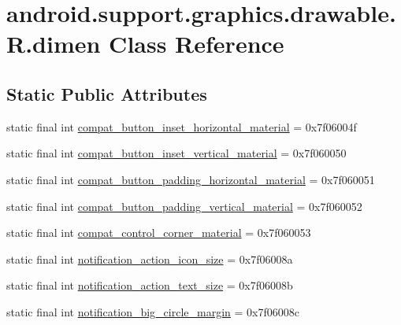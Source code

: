\hypertarget{classandroid_1_1support_1_1graphics_1_1drawable_1_1R_1_1dimen}{}\section{android.\+support.\+graphics.\+drawable.\+R.\+dimen Class Reference}
\label{classandroid_1_1support_1_1graphics_1_1drawable_1_1R_1_1dimen}
\subsection*{Static Public Attributes}
\begin{DoxyCompactItemize}
\item 
static final int \mbox{\hyperlink{classandroid_1_1support_1_1graphics_1_1drawable_1_1R_1_1dimen_a7f7d527f22e9d8d2ee59187664226463}{compat\+\_\+button\+\_\+inset\+\_\+horizontal\+\_\+material}} = 0x7f06004f
\item 
static final int \mbox{\hyperlink{classandroid_1_1support_1_1graphics_1_1drawable_1_1R_1_1dimen_a63be3d83c54a095097df721599e48e0d}{compat\+\_\+button\+\_\+inset\+\_\+vertical\+\_\+material}} = 0x7f060050
\item 
static final int \mbox{\hyperlink{classandroid_1_1support_1_1graphics_1_1drawable_1_1R_1_1dimen_a4ea17016e6b166cb8ef3bfd1fbb4a7bf}{compat\+\_\+button\+\_\+padding\+\_\+horizontal\+\_\+material}} = 0x7f060051
\item 
static final int \mbox{\hyperlink{classandroid_1_1support_1_1graphics_1_1drawable_1_1R_1_1dimen_a2c358fa78e3f83e69efa4829b9d2d94d}{compat\+\_\+button\+\_\+padding\+\_\+vertical\+\_\+material}} = 0x7f060052
\item 
static final int \mbox{\hyperlink{classandroid_1_1support_1_1graphics_1_1drawable_1_1R_1_1dimen_a966c908b1fcfad1d3ba12bf14a9814c4}{compat\+\_\+control\+\_\+corner\+\_\+material}} = 0x7f060053
\item 
static final int \mbox{\hyperlink{classandroid_1_1support_1_1graphics_1_1drawable_1_1R_1_1dimen_ad7766e60797bfcc0cda3c581b3bbc6b6}{notification\+\_\+action\+\_\+icon\+\_\+size}} = 0x7f06008a
\item 
static final int \mbox{\hyperlink{classandroid_1_1support_1_1graphics_1_1drawable_1_1R_1_1dimen_a12364835fa328aaaacc7102f1964db4d}{notification\+\_\+action\+\_\+text\+\_\+size}} = 0x7f06008b
\item 
static final int \mbox{\hyperlink{classandroid_1_1support_1_1graphics_1_1drawable_1_1R_1_1dimen_a3fec7894f5b9765aa912a41bce8991a2}{notification\+\_\+big\+\_\+circle\+\_\+margin}} = 0x7f06008c

\end{DoxyCompactItemize}
